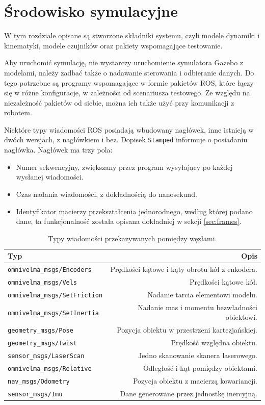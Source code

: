 \chapter{Środowisko symulacyjne}
\label{sec:model}
W tym rozdziale opisane są stworzone składniki systemu, czyli modele dynamiki i kinematyki, modele czujników oraz pakiety wspomagające testowanie.

Aby uruchomić symulację, nie wystarczy uruchomienie symulatora Gazebo z modelami, należy zadbać także o nadawanie sterowania i odbieranie danych.
Do tego potrzebne są programy wspomagające w formie pakietów ROS, które łączy się w różne konfiguracje, w zależności od scenariusza testowego.
Ze względu na niezależność pakietów od siebie, można ich także użyć przy komunikacji z robotem.

Niektóre typy wiadomości ROS posiadają wbudowany nagłówek, inne istnieją w dwóch wersjach, z nagłówkiem i bez. 
Dopisek \texttt{Stamped} informuje o posiadaniu nagłówka.
Nagłówek ma trzy pola:
\begin{itemize}
	\item Numer sekwencyjny, zwiększany przez program wysyłający po każdej wysłanej wiadomości.
	\item Czas nadania wiadomości, z dokładnością do nanosekund.
	\item Identyfikator macierzy przekształcenia jednorodnego, według której podano dane, ta funkcjonalność została opisana dokładniej w sekcji \ref{sec:frames}.
\end{itemize}

\begin{table}
	\centering
	\begin{tabular}{l r}
		Typ & Opis \\
		\hline
		\texttt{omnivelma\_msgs/Encoders} & Prędkości kątowe i kąty obrotu kół z enkodera. \\
		\texttt{omnivelma\_msgs/Vels} & Prędkości kątowe kół. \\
		\texttt{omnivelma\_msgs/SetFriction} & Nadanie tarcia elementowi modelu. \\
		\texttt{omnivelma\_msgs/SetInertia} & Nadanie mas i momentu bezwładności obiektowi. \\
		\texttt{geometry\_msgs/Pose} & Pozycja obiektu w przestrzeni kartezjańskiej. \\
		\texttt{geometry\_msgs/Twist} & Prędkość względna obiektu. \\
		\texttt{sensor\_msgs/LaserScan} & Jedno skanowanie skanera laserowego. \\
		\texttt{omnivelma\_msgs/Relative} & Odległość i kąt pomiędzy obiektami. \\
		\texttt{nav\_msgs/Odometry} & Pozycja obiektu z macierzą kowariancji. \\
		\texttt{sensor\_msgs/Imu} & Dane generowane przez jednostkę inercyjną. \\
	\end{tabular}
	\caption{Typy wiadomości przekazywanych pomiędzy węzłami.}
	\label{tab:messages}
\end{table}

